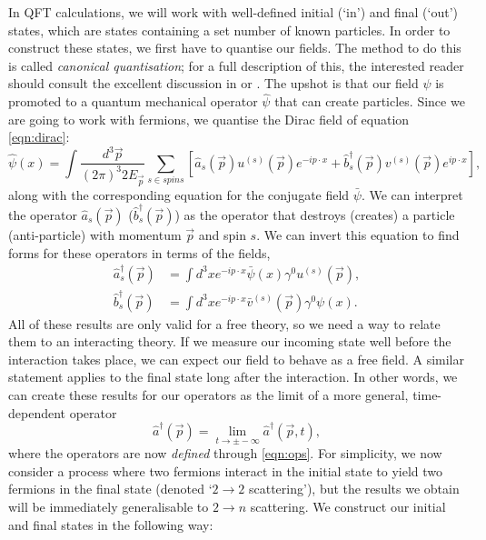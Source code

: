 In QFT calculations, we will work with well-defined initial (`in') and final (`out') states, which are states containing a set number of known particles. In order to construct these states, we first have to quantise our fields. The method to do this is called \emph{canonical quantisation}; for a full description of this, the interested reader should consult the excellent discussion in \cite{Peskin1995} or \cite{Srednicki2007}. The upshot is that our field $\psi$ is promoted to a quantum mechanical operator $\hat{\psi}$ that can create particles. Since we are going to work with fermions, we quantise the Dirac field of equation \ref{eqn:dirac}:
\begin{equation}
\hat{\psi}(x) = \int \frac{d^3 \vec{p}}{(2 \pi)^3 2 E_{\vec{p}}} \sum_{s \in spins} \left[\hat{a}_s(\vec{p}) u^{(s)}(\vec{p}) e^{-ip\cdot x} + \hat{b}_s^\dagger(\vec{p}) v^{(s)}(\vec{p})e^{i p \cdot x} \right],
\end{equation}
along with the corresponding equation for the conjugate field $\bar{\psi}$. We can interpret the operator $\hat{a}_s(\vec{p})$ ($\hat{b}^\dagger_s (\vec{p})$) as the operator that destroys (creates) a particle (anti-particle) with momentum $\vec{p}$ and spin $s$. We can invert this equation to find forms for these operators in terms of the fields,
\begin{subequations}
\label{eqn:ops}
\begin{align}
\hat{a}_s^\dagger (\vec{p}) & = \int d^3 x e^{-i p \cdot x} \bar{\psi}(x) \gamma^0 u^{(s)}(\vec{p}), \\
\hat{b}_s^\dagger (\vec{p}) & = \int d^3 x e^{- i p \cdot x} \bar{v}^{(s)}(\vec{p}) \gamma^0 \psi(x).
\end{align}
\end{subequations}
All of these results are only valid for a free theory, so we need a way to relate them to an interacting theory. If we measure our incoming state well before the interaction takes place, we can expect our field to behave as a free field. A similar statement applies to the final state long after the interaction. In other words, we can create these results for our operators as the limit of a more general, time-dependent operator
\begin{equation}
\hat{a}^\dagger(\vec{p}) = \lim_{t \to \pm -\infty} \hat{a}^\dagger(\vec{p}, t),
\end{equation}
where the operators are now \emph{defined} through \ref{eqn:ops}. For simplicity, we now consider a process where two fermions interact in the initial state to yield two fermions in the final state (denoted `$2\to2$ scattering'), but the results we obtain will be immediately generalisable to $2 \to n$ scattering. We construct our initial and final states in the following way:

